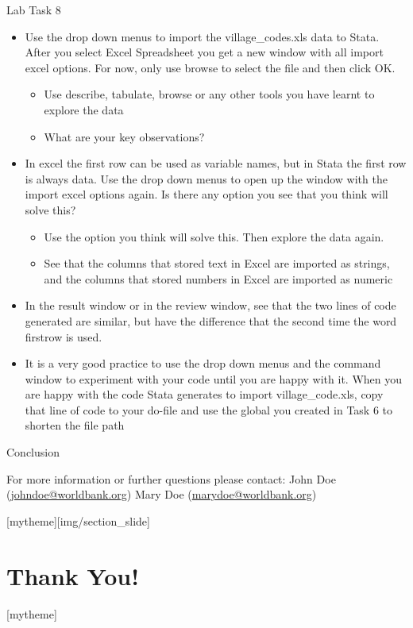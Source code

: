 \documentclass[aspectratio=169]{beamer}
\newcommand{\sectionpic}[2]{
	\setbeamertemplate{section page}[mytheme][#2]
	\section{#1}
	\setbeamertemplate{section page}[mytheme]
}
\begin{document}
\begin{frame}{Lab Task 8}
\begin{itemize}
	\item Use the drop down menus to import the village\_codes.xls data to Stata. After you select Excel Spreadsheet you get a new window with all import excel options. For now, only use browse to select the file and then click OK.
		\begin{itemize}
			\item Use describe, tabulate, browse or any other tools you have learnt to explore the data
			\item What are your key observations?
		\end{itemize}
	\item In excel the first row can be used as variable names, but in Stata the first row is always data. Use the drop down menus to open up the window with the import excel options again. Is there any option you see that you think will solve this?
		\begin{itemize}
			\item Use the option you think will solve this. Then explore the data again.
			\item See that the columns that stored text in Excel are imported as strings, and the columns that stored numbers in Excel are imported as numeric
		\end{itemize}	 
	\item In the result window or in the review window, see that the two lines of code generated are similar, but have the difference that the second time the word firstrow is used. 
	\item It is a very good practice to use the drop down menus and the command window to experiment with your code until you are happy with it. When you are happy with the code Stata generates to import village\_code.xls, copy that line of code to your do-file and use the global you created in Task 6 to shorten the file path
\end{itemize}
\end{frame}

\begin{frame}{Conclusion}


\vspace{20mm}
For more information or further questions please contact:
\newline John Doe (\url{johndoe@worldbank.org}) \newline Mary Doe (\url{marydoe@worldbank.org})

\end{frame}

\sectionpic{Thank You!}{img/section_slide}
\end{document}
